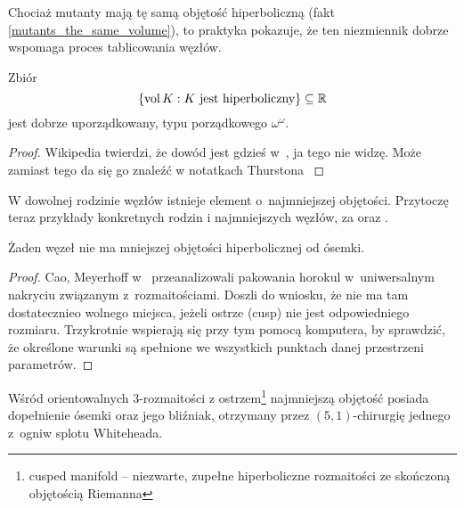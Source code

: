 Chociaż mutanty mają tę samą objętość hiperboliczną (fakt \ref{mutants_the_same_volume}), to praktyka pokazuje, że ten niezmiennik dobrze wspomaga proces tablicowania węzłów.

\begin{proposition}
    Zbiór
    $$\{\operatorname{vol} K: K \textrm{ jest hiperboliczny}\} \subseteq \mathbb R$$
    jest dobrze uporządkowany, typu porządkowego $\omega^\omega$.
\end{proposition}

\begin{proof}
    Wikipedia twierdzi, że dowód jest gdzieś w~\cite{neumann85}, ja tego nie widzę.
    Może zamiast tego da się go znaleźć w notatkach Thurstona \cite{thurston02}
\end{proof}

W dowolnej rodzinie węzłów istnieje element o~najmniejszej objętości.
Przytoczę teraz przykłady konkretnych rodzin i najmniejszych węzłów, za \cite[s. 16-17]{purcell19} oraz \cite[s. 1-99]{hodgson13}.

\begin{proposition}
    \label{prp:eight_least_hyperbolic}
    Żaden węzeł nie ma mniejszej objętości hiperbolicznej od ósemki.
\end{proposition}

\begin{proof}
    Cao, Meyerhoff w~\cite{cao01} przeanalizowali pakowania horokul w~uniwersalnym nakryciu związanym z~rozmaitościami.
    Doszli do wniosku, że nie ma tam dostatecznieo wolnego miejsca, jeżeli ostrze (cusp) nie jest odpowiedniego rozmiaru.
    Trzykrotnie wspierają się przy tym pomocą komputera, by sprawdzić, że określone warunki są spełnione we wszystkich punktach danej przestrzeni parametrów.
\end{proof}

\begin{proposition}
    Wśród orientowalnych 3-rozmaitości z ostrzem\footnote{cusped manifold -- niezwarte, zupełne hiperboliczne rozmaitości ze skończoną objętością Riemanna} najmniejszą objętość posiada dopełnienie ósemki oraz jego bliźniak, otrzymany przez $(5, 1)$-chirurgię jednego z~ogniw splotu Whiteheada.
%
%
\end{proposition}

